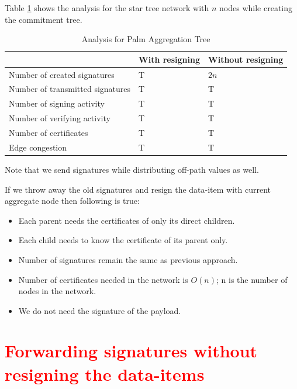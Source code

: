 	  Table \ref{table:Analysis table for Palm Aggregation Tree} shows the analysis for the star tree network with $n$ nodes while creating the commitment tree.
		\begin{table}[!htb]	
			\begin{center}
				\begin{tabular}{ |l| l| l| }
			    \hline
			    & With resigning & Without resigning \\
			    \hline
			    Number of created signatures & T & $2n$ \\	
			    \hline
			    Number of transmitted signatures & T & T\\
			    \hline
			    Number of signing activity & T & T \\
			    \hline
			    Number of verifying activity & T & T \\
			    \hline
			    Number of certificates & T & T \\
			    \hline
			    Edge congestion & T & T\\
			    \hline
				\end{tabular}
			\end{center}
	  	\caption{Analysis for Palm Aggregation Tree}
		  \label{table:Analysis table for Palm Aggregation Tree}
	  \end{table} 
		
		Note that we send signatures while distributing off-path values as well.
	
		If we throw away the old signatures and resign the data-item with current aggregate node then following is true:
			\begin{itemize}
				\item Each parent needs the certificates of only its direct children.
				\item Each child needs to know the certificate of its parent only.
				\item Number of signatures remain the same as previous approach.
				\item Number of certificates needed in the network is $O(n)$; n is the number of nodes in the network.
				\item We do not need the signature of the payload.
			\end{itemize}

	\section{\textcolor{red}{Forwarding signatures without resigning the data-items}}

